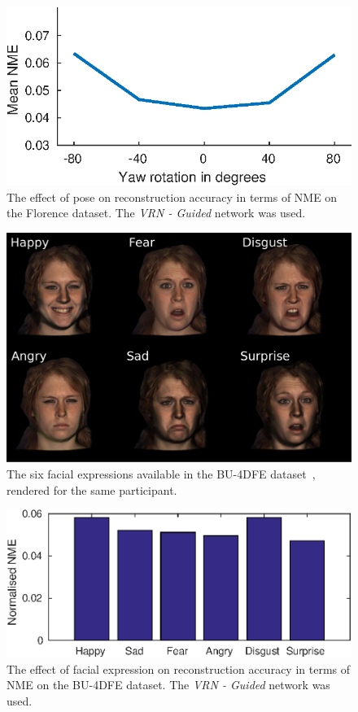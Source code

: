 \begin{figure}
  \centering
  \includegraphics[width=0.6\linewidth]{curves/ablation_pose.eps}
  \caption[Effect of pose]{The effect of pose on reconstruction
    accuracy in terms of NME on the Florence dataset. The \textit{VRN
      - Guided} network was used.}
  \label{fig:effect_pose}
\end{figure}

\begin{figure}
  \centering
  \includegraphics[width=0.8\linewidth]{img/bu4dfe_expressions.pdf}
  \caption[The six facial expressions available in the BU-4DFE
  dataset]{The six facial expressions available in the BU-4DFE
    dataset~\cite{yin2008high}, rendered for the same participant.}
  \label{fig:bu4dfe_expressions}
\end{figure}

\begin{figure}
  \centering
  \includegraphics[width=0.7\linewidth]{curves/ablation_expression.eps}
  \caption[Effect of facial expressions]{The effect of facial
    expression on reconstruction accuracy in terms of NME on the
    BU-4DFE dataset. The \textit{VRN - Guided} network was used.}
  \label{fig:effect_expression}
\end{figure}

